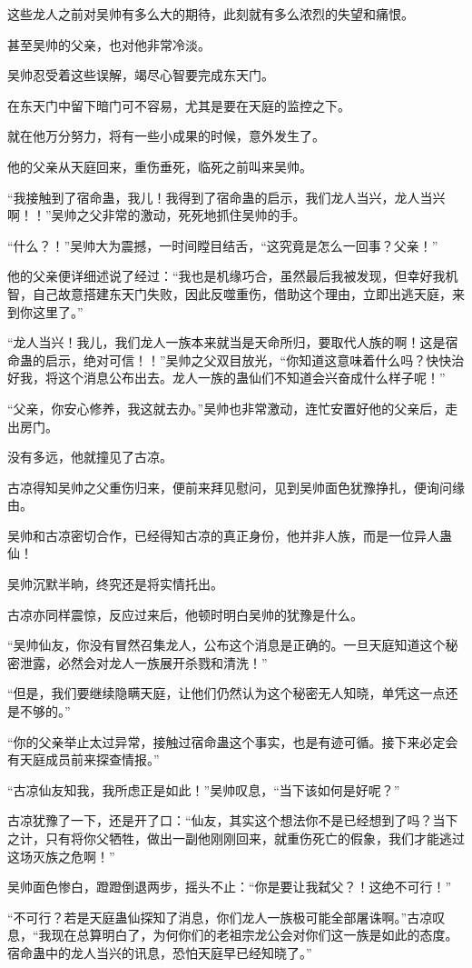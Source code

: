 \begin{this_body}
这些龙人之前对吴帅有多么大的期待，此刻就有多么浓烈的失望和痛恨。

甚至吴帅的父亲，也对他非常冷淡。

吴帅忍受着这些误解，竭尽心智要完成东天门。

在东天门中留下暗门可不容易，尤其是要在天庭的监控之下。

就在他万分努力，将有一些小成果的时候，意外发生了。

他的父亲从天庭回来，重伤垂死，临死之前叫来吴帅。

“我接触到了宿命蛊，我儿！我得到了宿命蛊的启示，我们龙人当兴，龙人当兴啊！！”吴帅之父非常的激动，死死地抓住吴帅的手。

“什么？！”吴帅大为震撼，一时间瞠目结舌，“这究竟是怎么一回事？父亲！”

他的父亲便详细述说了经过：“我也是机缘巧合，虽然最后我被发现，但幸好我机智，自己故意搭建东天门失败，因此反噬重伤，借助这个理由，立即出逃天庭，来到你这里了。”

“龙人当兴！我儿，我们龙人一族本来就当是天命所归，要取代人族的啊！这是宿命蛊的启示，绝对可信！！”吴帅之父双目放光，“你知道这意味着什么吗？快快治好我，将这个消息公布出去。龙人一族的蛊仙们不知道会兴奋成什么样子呢！”

“父亲，你安心修养，我这就去办。”吴帅也非常激动，连忙安置好他的父亲后，走出房门。

没有多远，他就撞见了古凉。

古凉得知吴帅之父重伤归来，便前来拜见慰问，见到吴帅面色犹豫挣扎，便询问缘由。

吴帅和古凉密切合作，已经得知古凉的真正身份，他并非人族，而是一位异人蛊仙！

吴帅沉默半晌，终究还是将实情托出。

古凉亦同样震惊，反应过来后，他顿时明白吴帅的犹豫是什么。

“吴帅仙友，你没有冒然召集龙人，公布这个消息是正确的。一旦天庭知道这个秘密泄露，必然会对龙人一族展开杀戮和清洗！”

“但是，我们要继续隐瞒天庭，让他们仍然认为这个秘密无人知晓，单凭这一点还是不够的。”

“你的父亲举止太过异常，接触过宿命蛊这个事实，也是有迹可循。接下来必定会有天庭成员前来探查情报。”

“古凉仙友知我，我所虑正是如此！”吴帅叹息，“当下该如何是好呢？”

古凉犹豫了一下，还是开了口：“仙友，其实这个想法你不是已经想到了吗？当下之计，只有将你父牺牲，做出一副他刚刚回来，就重伤死亡的假象，我们才能逃过这场灭族之危啊！”

吴帅面色惨白，蹬蹬倒退两步，摇头不止：“你是要让我弑父？！这绝不可行！”

“不可行？若是天庭蛊仙探知了消息，你们龙人一族极可能全部屠诛啊。”古凉叹息，“我现在总算明白了，为何你们的老祖宗龙公会对你们这一族是如此的态度。宿命蛊中的龙人当兴的讯息，恐怕天庭早已经知晓了。”

\end{this_body}

